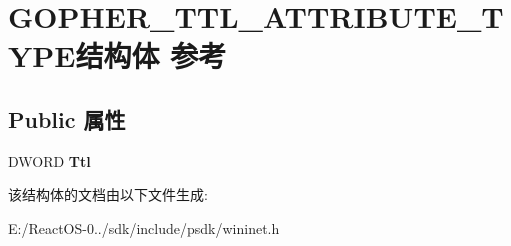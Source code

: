 \hypertarget{struct_g_o_p_h_e_r___t_t_l___a_t_t_r_i_b_u_t_e___t_y_p_e}{}\section{G\+O\+P\+H\+E\+R\+\_\+\+T\+T\+L\+\_\+\+A\+T\+T\+R\+I\+B\+U\+T\+E\+\_\+\+T\+Y\+P\+E结构体 参考}
\label{struct_g_o_p_h_e_r___t_t_l___a_t_t_r_i_b_u_t_e___t_y_p_e}
\subsection*{Public 属性}
\begin{DoxyCompactItemize}
\item 
\mbox{\label{struct_g_o_p_h_e_r___t_t_l___a_t_t_r_i_b_u_t_e___t_y_p_e_a89f8e83c2d7d42e364733627ccd64b12}} 
D\+W\+O\+RD {\bfseries Ttl}
\end{DoxyCompactItemize}


该结构体的文档由以下文件生成\+:\begin{DoxyCompactItemize}
\item 
E\+:/\+React\+O\+S-\/0../sdk/include/psdk/wininet.\+h\end{DoxyCompactItemize}
